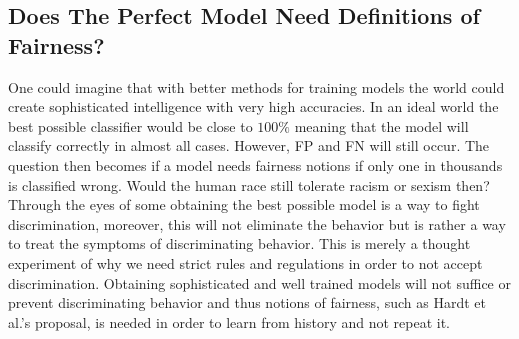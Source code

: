 \documentclass[11pt, fleqn, titlepage]{article}
\begin{document}
	\subsection{Does The Perfect Model Need Definitions of Fairness?}\label{perf_model}
	One could imagine that with better methods for training models the world could create sophisticated intelligence with very high accuracies. In an ideal world the best possible classifier would be close to $ 100 \% $ meaning that the model will classify correctly in almost all cases. However, FP and FN will still occur. The question then becomes if a model needs fairness notions if only one in thousands is classified wrong. Would the human race still tolerate racism or sexism then? Through the eyes of some obtaining the best possible model is a way to fight discrimination, moreover, this will not eliminate the behavior but is rather a way to treat the symptoms of discriminating behavior. This is merely a thought experiment of why we need strict rules and regulations in order to not accept discrimination. Obtaining sophisticated and well trained models will not suffice or prevent discriminating behavior and thus notions of fairness, such as Hardt et al.'s proposal, is needed in order to learn from history and not repeat it.
	
\end{document}
